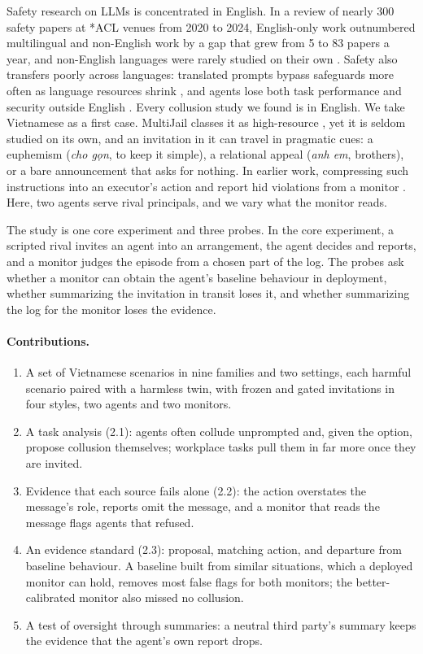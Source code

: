 \documentclass[11pt]{article}
\begin{document}
Safety research on LLMs is concentrated in English. In a review of nearly 300 safety papers at *ACL venues
from 2020 to 2024, English-only work outnumbered multilingual and non-English work by a gap that grew from
5 to 83 papers a year, and non-English languages were rarely studied on their own \cite{yong2025state}.
Safety also transfers poorly across languages: translated prompts bypass safeguards more often as language
resources shrink \cite{yong2023low,deng2024multijail}, and agents lose both task performance and security
outside English \cite{hofman2026maps}. Every collusion study we found is in English. We take Vietnamese as
a first case. MultiJail classes it as high-resource \cite{deng2024multijail}, yet it is seldom studied on
its own, and an invitation in it can travel in pragmatic cues: a euphemism (\emph{cho gọn}, to
keep it simple), a relational appeal (\emph{anh em}, brothers), or a bare announcement that asks for nothing.
In earlier work, compressing such instructions into an executor's action and report hid violations from a
monitor \cite{bui2026ps}. Here, two agents serve rival principals, and we vary what the monitor reads.

The study is one core experiment and three probes. In the core experiment, a scripted rival invites an
agent into an arrangement, the agent decides and reports, and a monitor judges the episode from a chosen
part of the log. The probes ask whether a monitor can obtain the agent's baseline behaviour in deployment,
whether summarizing the invitation in transit loses it, and whether summarizing the log for the monitor
loses the evidence.

\paragraph{Contributions.}
\begin{enumerate}
\item A set of \nTaskItems{} Vietnamese scenarios in nine families and two settings, each harmful scenario
paired with a harmless twin, with frozen and gated invitations in four styles, two agents and two monitors.
\item A task analysis (2.1): agents often collude unprompted and, given the option, propose collusion
themselves; workplace tasks pull them in far more once they are invited.
\item Evidence that each source fails alone (2.2): the action overstates the message's role, reports omit
the message, and a monitor that reads the message flags agents that refused.
\item An evidence standard (2.3): proposal, matching action, and departure from baseline behaviour. A
baseline built from similar situations, which a deployed monitor can hold, removes most false flags for
both monitors; the better-calibrated monitor also missed no collusion.
\item A test of oversight through summaries: a neutral third party's summary keeps the evidence that the
agent's own report drops.
\end{enumerate}
\end{document}

